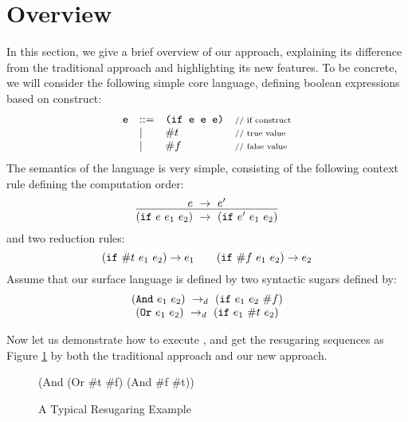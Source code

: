 \section{Overview}
\label{sec2}

In this section, we give a brief overview of our approach, explaining its difference from the traditional approach and highlighting its new features. To be concrete, we will consider the following simple core language, defining boolean expressions based on  construct:
\[
\begin{array}{lllll}
\mbox{\tt e} &::=& \texttt{(if~e~e~e)} &\mbox{{\scriptsize // if construct}}\\
& |& \#t  & \mbox{{\scriptsize // true value}}\\
& |& \#f & \mbox{{\scriptsize // false value}}
\end{array}
\]
The semantics of the language is very simple, consisting of the following context rule defining the computation order:
\[
\centering
\infer
{(\m{if}~e~e_1~e_2)~\rightarrow~(\m{if}~e'~e_1~e_2)}
{e~\rightarrow~e'}
\]
and two reduction rules:
\[
\centering
(\m{if}~\#t~e_1~e_2) \rightarrow e_1 \qquad (\m{if}~\#f~e_1~e_2) \rightarrow e_2
\]
Assume that our surface language is defined by two syntactic sugars defined by:
\[
\begin{array}{c}
(\mbox{\tt And}~e_1~e_2) ~\rightarrow_d~ (\mbox{\tt if}~e_1~e_2~\#f)\\
(\mbox{\tt Or}~e_1~e_2) ~\rightarrow_d~ (\mbox{\tt if}~e_1~\#t~e_2)
\end{array}
\]


Now let us demonstrate how to execute , and get the resugaring sequences as Figure \ref{fig:standard} by both the traditional approach and our new approach.

\begin{figure}[t]
\begin{center}
\begin{minipage}{6cm}
\begin{scriptsize}
\begin{Codes}
    (And (Or \#t \#f) (And \#f \#t))
\end{Codes}
\end{scriptsize}
\end{minipage}
\end{center}
\caption{A Typical Resugaring Example}
\label{fig:standard}
\end{figure}




